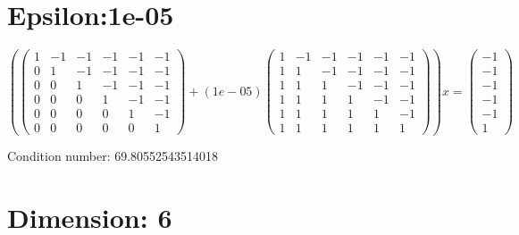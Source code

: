 \documentclass{article}%
\begin{document}
\section{Epsilon:1e{-}05}%
\label{sec:Epsilon1e{-}05}%
\[%
( \begin{pmatrix}%
1&-1&-1&-1&-1&-1\\%
0&1&-1&-1&-1&-1\\%
0&0&1&-1&-1&-1\\%
0&0&0&1&-1&-1\\%
0&0&0&0&1&-1\\%
0&0&0&0&0&1%
\end{pmatrix} + ( 1e{-}05 ) \begin{pmatrix}%
1&-1&-1&-1&-1&-1\\%
1&1&-1&-1&-1&-1\\%
1&1&1&-1&-1&-1\\%
1&1&1&1&-1&-1\\%
1&1&1&1&1&-1\\%
1&1&1&1&1&1%
\end{pmatrix} )x = \begin{pmatrix}%
-1\\%
-1\\%
-1\\%
-1\\%
-1\\%
1%
\end{pmatrix}%
\]%
\begin{Large}%
Condition number:%
69.80552543514018%
\end{Large}

%
\section{Dimension: 6}%
\label{sec:Dimension6}%
\end{document}
